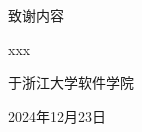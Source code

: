 \cleardoublepage
{}
{%
    致谢内容

    \begin{flushright}
        xxx

        于浙江大学软件学院

        2024年12月23日
    \end{flushright}
}